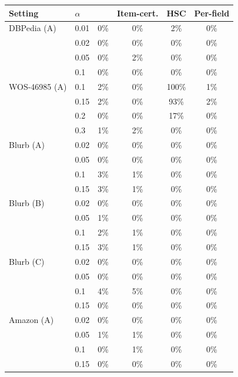 \begin{tabular}{llcccc}
\toprule
Setting & $\alpha$ & \hlcl{} & Item-cert. & HSC & Per-field \\
\midrule
DBPedia (A) & 0.01 & 0\% & 0\% & 2\% & 0\% \\
 & 0.02 & 0\% & 0\% & 0\% & 0\% \\
 & 0.05 & 0\% & 2\% & 0\% & 0\% \\
 & 0.1 & 0\% & 0\% & 0\% & 0\% \\
\addlinespace
WOS-46985 (A) & 0.1 & 2\% & 0\% & 100\% & 1\% \\
 & 0.15 & 2\% & 0\% & 93\% & 2\% \\
 & 0.2 & 0\% & 0\% & 17\% & 0\% \\
 & 0.3 & 1\% & 2\% & 0\% & 0\% \\
\addlinespace
Blurb (A) & 0.02 & 0\% & 0\% & 0\% & 0\% \\
 & 0.05 & 0\% & 0\% & 0\% & 0\% \\
 & 0.1 & 3\% & 1\% & 0\% & 0\% \\
 & 0.15 & 3\% & 1\% & 0\% & 0\% \\
\addlinespace
Blurb (B) & 0.02 & 0\% & 0\% & 0\% & 0\% \\
 & 0.05 & 1\% & 0\% & 0\% & 0\% \\
 & 0.1 & 2\% & 1\% & 0\% & 0\% \\
 & 0.15 & 3\% & 1\% & 0\% & 0\% \\
\addlinespace
Blurb (C) & 0.02 & 0\% & 0\% & 0\% & 0\% \\
 & 0.05 & 0\% & 0\% & 0\% & 0\% \\
 & 0.1 & 4\% & 5\% & 0\% & 0\% \\
 & 0.15 & 0\% & 0\% & 0\% & 0\% \\
\addlinespace
Amazon (A) & 0.02 & 0\% & 0\% & 0\% & 0\% \\
 & 0.05 & 1\% & 1\% & 0\% & 0\% \\
 & 0.1 & 0\% & 1\% & 0\% & 0\% \\
 & 0.15 & 0\% & 0\% & 0\% & 0\% \\
\bottomrule
\end{tabular}
